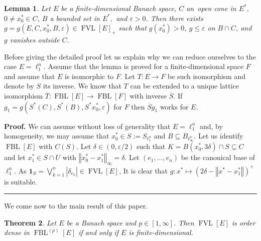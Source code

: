 \documentclass[12pt]{article}%
\newtheorem{theorem}{Theorem}
\newtheorem{lemma}[theorem]{Lemma}
\newenvironment{proof}[1][Proof]{\noindent\textbf{#1.} }{\ \rule{0.5em}{0.5em}}
\begin{document}
\begin{lemma}
\textit{\label{F}}Let $E$ \textit{be a finite-dimensional Banach space, }$C$
an\textit{\ open cone in} $E^{\ast},$ $0\neq x_{0}^{\ast}\in C$, $B$ a bounded
set in $E^{\ast},$ \textit{and }$\varepsilon>0$. \textit{Then there exists}
$g=g\left(  E,C,x_{0}^{\ast},B,\varepsilon\right)  \in\operatorname*{FVL}%
[E]_{+}$ \textit{such} \textit{that} $g(x_{0}^{\ast})>0,\ g\leq\varepsilon$
\textit{on} $B\cap C$, \textit{and} $g$ \textit{vanishes outside} $C$.
\end{lemma}

Before giving the detailed proof let us explain why we can reduce ourselves to
the case $E=\ell_{1}^{n}.$ Assume that the lemma is proved for a
finite-dimensional space $F$ and assume that $E$ is isomorphic to $F.$ Let
$T:E\longrightarrow F$ be such isomorphism and denote by $S$ its inverse. We
know that $T$ can be extended to a unique lattice isomorphism $\overline
{T}:\operatorname*{FBL}\left[  E\right]  \longrightarrow\operatorname*{FBL}%
\left[  F\right]  $ with inverse $\overline{S}.$ If $g_{1}=g\left(  S^{\ast
}\left(  C\right)  ,S^{\ast}\left(  B\right)  ,S^{\ast}x_{0}^{\ast
},\varepsilon\right)  $ for $F$ then $\overline{S}g_{1}$ works for $E.$

\begin{proof}
We can assume without loss of generality that $E=\ell_{1}^{n}$ and, by
homogeneity, we may assume that $x_{0}^{\ast}\in S:=S_{\ell_{1}^{n}}$ and
$B\subseteq B_{\ell_{\infty}^{n}}.$ Let us identify $\operatorname*{FBL}%
\left[  E\right]  $ with $C\left(  S\right)  .$ Let $\delta\in\left(
0,\varepsilon/2\right)  $ such that $K=B\left(  x_{0}^{\ast},3\delta\right)
\cap S\subseteq C$ and let $x_{1}^{\ast}\in S\cap U$ with $\left\Vert
x_{0}^{\ast}-x_{1}^{\ast}\right\Vert _{\infty}=\delta.$ Let $\left(
e_{1},...,e_{n}\right)  $ be the canonical base of $\ell_{1}^{n}.$ As
$\mathbf{1}_{S}=\bigvee\limits_{k=1}^{n}\left\vert \delta_{e_{k}}\right\vert
\in\operatorname*{FVL}\left[  E\right]  $, It is clear that $g:x^{\ast
}\longmapsto\left(  2\delta-\left\Vert x^{\ast}-x_{1}^{\ast}\right\Vert
\right)  ^{+}$ is suitable.
\end{proof}

We come now to the main result of this paper.

\begin{theorem}
\label{Main}Let $E$ be a Banach space and $p\in\left[  1,\infty\right]  .$
Then $\operatorname*{FVL}\left[  E\right]  $ is order dense in
$\operatorname*{FBL}\nolimits^{(p)}\left[  E\right]  $ if and only if $E$ is finite-dimensional.
\end{theorem}
\end{document}
